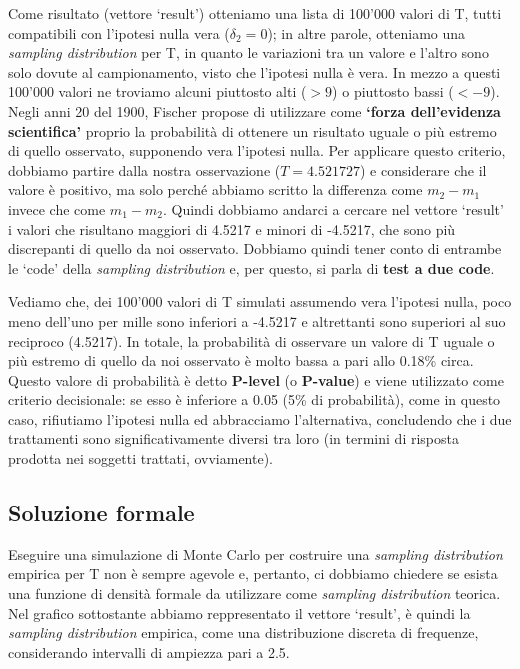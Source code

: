 \documentclass[a4paper,12pt,oneside]{book}
\begin{document}
Come risultato (vettore `result') otteniamo una lista di 100'000 valori di T, tutti compatibili con l'ipotesi nulla vera (\(\delta_2 = 0\)); in altre parole, otteniamo una \emph{sampling distribution} per T, in quanto le variazioni tra un valore e l'altro sono solo dovute al campionamento, visto che l'ipotesi nulla è vera. In mezzo a questi 100'000 valori ne troviamo alcuni piuttosto alti (\(> 9\)) o piuttosto bassi (\(< - 9\)). Negli anni 20 del 1900, Fischer propose di utilizzare come \textbf{`forza dell'evidenza scientifica'} proprio la probabilità di ottenere un risultato uguale o più estremo di quello osservato, supponendo vera l'ipotesi nulla. Per applicare questo criterio, dobbiamo partire dalla nostra osservazione (\(T = 4.521727\)) e considerare che il valore è positivo, ma solo perché abbiamo scritto la differenza come \(m_2 - m_1\) invece che come \(m_1 - m_2\). Quindi dobbiamo andarci a cercare nel vettore `result' i valori che risultano maggiori di 4.5217 e minori di -4.5217, che sono più discrepanti di quello da noi osservato. Dobbiamo quindi tener conto di entrambe le `code' della \emph{sampling distribution} e, per questo, si parla di \textbf{test a due code}.

Vediamo che, dei 100'000 valori di T simulati assumendo vera l'ipotesi nulla, poco meno dell'uno per mille sono inferiori a -4.5217 e altrettanti sono superiori al suo reciproco (4.5217). In totale, la probabilità di osservare un valore di T uguale o più estremo di quello da noi osservato è molto bassa a pari allo 0.18\% circa. Questo valore di probabilità è detto \textbf{P-level} (o \textbf{P-value}) e viene utilizzato come criterio decisionale: se esso è inferiore a 0.05 (5\% di probabilità), come in questo caso, rifiutiamo l'ipotesi nulla ed abbracciamo l'alternativa, concludendo che i due trattamenti sono significativamente diversi tra loro (in termini di risposta prodotta nei soggetti trattati, ovviamente).

\hypertarget{soluzione-formale}{%
\subsection{Soluzione formale}\label{soluzione-formale}}

Eseguire una simulazione di Monte Carlo per costruire una \emph{sampling distribution} empirica per T non è sempre agevole e, pertanto, ci dobbiamo chiedere se esista una funzione di densità formale da utilizzare come \emph{sampling distribution} teorica. Nel grafico sottostante abbiamo reppresentato il vettore `result', è quindi la \emph{sampling distribution} empirica, come una distribuzione discreta di frequenze, considerando intervalli di ampiezza pari a 2.5.
\end{document}
